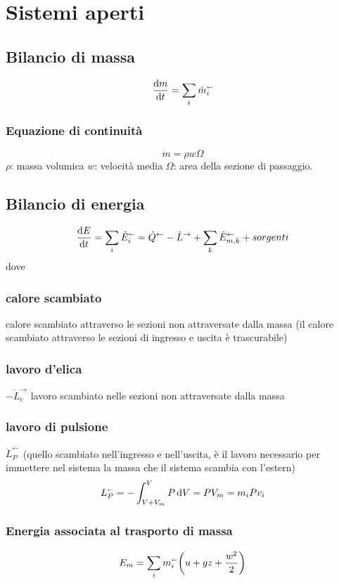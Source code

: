 \section{Sistemi aperti}

\subsection{Bilancio di massa}
\[ \dv{m}{t} = \sum_i \dot{m}_i^\shortleftarrow \]

\subsubsection{Equazione di continuità}
\[ \dot{m} = \rho w \Omega \]
$\rho$: massa volumica \newline
$w$: velocità media \newline
$\Omega$: area della sezione di passaggio.

\subsection{Bilancio di energia}
\[ \dv{E}{t} = \sum_i \dot{E}_i^\shortleftarrow = \dot{Q}^{\leftarrow } - \dot{L}^{\rightarrow } + \sum_{k} \dot{E}_{m,k}^{\leftarrow } + sorgenti \]
dove \newline
\subsubsection{calore scambiato}
calore scambiato attraverso le sezioni non attraversate dalla massa (il calore scambiato attraverso le sezioni di ingresso e uscita è trascurabile)

\subsubsection{lavoro d'elica}
$-\dot{L}_e^{\rightarrow }$ lavoro scambiato nelle sezioni non attraversate dalla massa

\subsubsection{lavoro di pulsione} 
$\dot{L}_P^{\leftarrow }$ (quello scambiato nell'ingresso e nell'uscita, è il lavoro necessario per immettere nel sistema la massa che il sistema scambia con l’estern) 
\[ L_P^\shortleftarrow = - \int^{V}_{V+V_m} P\dd{V} = PV_m = m_i P v_i \]

\subsubsection{Energia associata al trasporto di massa}
\[ E_m = \sum_i m_i^\shortleftarrow \qty(u + gz + \frac{w^2}{2}) \]

